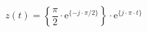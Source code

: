 \correct
\[
z(t) =  \left \{ \frac{\pi}{2} \cdot \textrm{e}^{\{-j \cdot \pi/2 \}} \right \} \cdot \textrm{e}^{\{ j \cdot \pi \cdot t \}}
\]
